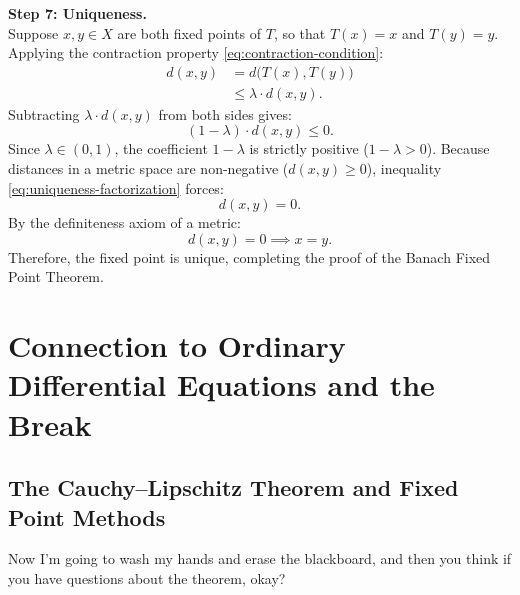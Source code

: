\begin{proofWrapper}
\begin{content}
\textbf{Step 7: Uniqueness.} \\
Suppose $x, y \in X$ are both fixed points of $T$, so that $T(x) = x$ and $T(y) = y$. Applying the contraction property \eqref{eq:contraction-condition}:
\begin{align}
d(x, y) &= d\bigl(T(x), T(y)\bigr) \nonumber \\
&\le \lambda \cdot d(x, y). \label{eq:uniqueness-contraction-ineq}
\end{align}
Subtracting $\lambda \cdot d(x, y)$ from both sides gives:
\begin{equation}\label{eq:uniqueness-factorization}
(1 - \lambda) \cdot d(x, y) \le 0.
\end{equation}
Since $\lambda \in (0, 1)$, the coefficient $1 - \lambda$ is strictly positive ($1 - \lambda > 0$). Because distances in a metric space are non-negative ($d(x, y) \ge 0$), inequality \eqref{eq:uniqueness-factorization} forces:
\begin{equation}\label{eq:distance-is-zero}
d(x, y) = 0.
\end{equation}
By the definiteness axiom of a metric:
\[
d(x, y) = 0 \implies x = y.
\]
Therefore, the fixed point is unique, completing the proof of the Banach Fixed Point Theorem.
\end{content}

\end{proofWrapper}

\begin{hidden}
\end{hidden}

\section{Connection to Ordinary Differential Equations and the Break}

\subsection{The Cauchy--Lipschitz Theorem and Fixed Point Methods}

\begin{speech}[00:39:49 - 00:40:57]
Now I'm going to wash my hands and erase the blackboard, and then you think if you have questions about the theorem, okay? 
\end{speech}

